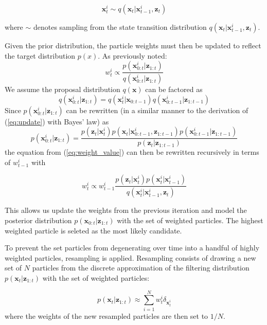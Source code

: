 \documentclass[letterpaper, 10 pt, conference]{ieeeconf}
\renewcommand{\vec}[1]{\boldsymbol{#1}}
\renewcommand{\eqref}[1]{\textup{{\normalfont(\ref{#1}}\normalfont)}}
\begin{document}
\begin{equation} \label{eq:propagate_particles}
	\vec{x}^i_t \sim q(\vec{x}_t|\vec{x}^i_{t-1}, \vec{z}_t)
\end{equation}

where $\sim$ denotes sampling from the state transition distribution $q(\vec{x}_t|\vec{x}^i_{t-1}, \vec{z}_t)$.

Given the prior distribution, the particle weights must then be updated to reflect the target distribution $p(x)$. As previously noted:
\begin{equation} \label{eq:weight_value}
	w^i_{t} \propto \frac{p(\vec{x}^i_{0:t}|\vec{z}_{1:t})}{q(\vec{x}^i_{0:t}|\vec{z}_{1:t}) }
\end{equation}
We assume the proposal distribution $q(\vec{x})$ can be factored as
\begin{equation*}
	q(\vec{x}^i_{0:t}|\vec{z}_{1:t}) = q(\vec{x}^i_t|\vec{x}_{0:t-1})q(\vec{x}^i_{0:t-1}|\vec{z}_{1:t-1})
\end{equation*}
Since $p(\vec{x}^i_{0:t}|\vec{z}_{1:t})$ can be rewritten (in a similar manner to the derivation of \eqref{eq:update} with Bayes' law) as
\begin{equation*}
	p(\vec{x}^i_{0:t}|\vec{z}_{1:t}) = 
	\frac{p(\vec{z}_t|\vec{x}^i_t)p(\vec{x}_t|\vec{x}^i_{0:t-1}, \vec{z}_{1:t-1})p(\vec{x}^i_{0:t-1}|\vec{z}_{1:t-1})}{p(\vec{z}_t|\vec{z}_{1:t-1})}
\end{equation*}
the equation from \eqref{eq:weight_value} can then be rewritten recursively in terms of $w^i_{t-1}$ with

\begin{equation} \label{eq:update_weights}
	w^i_t \propto w^i_{t-1} \frac{p(\vec{z}_t|\vec{x}^i_t)p(\vec{x}^i_t|\vec{x}^i_{t-1})}{q(\vec{x}^i_t|\vec{x}^i_{t-1},\vec{z}_t)}
\end{equation}

This allows us update the weights from the previous iteration and model the posterior distribution $p(\vec{x}_{0:t}|\vec{z}_{1:t})$ with the set of weighted particles. The highest weighted particle is seleted as the most likely candidate.

To prevent the set particles from degenerating over time into a handful of highly weighted particles, resampling is applied. Resampling consists of drawing a new set of $N$ particles from the discrete approximation of the filtering distribution $p(\vec{x}_t|\vec{z}_{1:t})$ with the set of weighted particles:

\begin{equation}
	p(\vec{x}_t|\vec{z}_{1:t}) \approx \sum_{i=1}^{N}{w^i_t\delta_{\vec{x}^i_t}}
\end{equation}
where the weights of the new resampled particles are then set to $1/N$.
\end{document}
